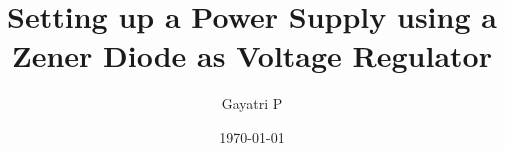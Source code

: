 \documentclass[reprint,amsmath,amssymb,aps]{revtex4-2}
\begin{document}
    \title{Setting up a Power Supply using a Zener Diode as Voltage Regulator}

    \author{Gayatri P}
    \date{\today}

    
    \maketitle

    
    
    

    
    
    \nocite{*}
\end{document}
